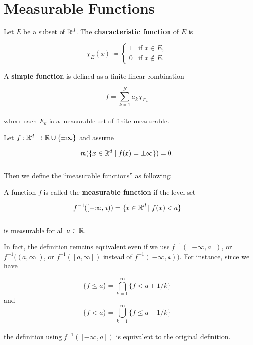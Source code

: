 \documentclass[12pt, a4paper, openany, twoside]{book}
\theoremstyle{definition}
\theoremstyle{remark}
\theoremstyle{plain}
\numberwithin{equation}{section}
\begin{document}
\section{Measurable Functions}
\vspace{5mm}
\begin{tcolorbox}[colback=yellow!10!white,colframe=blue!75!black,title=Definition 1.4.1]\label{Definition 1.4.1}
    Let $E$ be a subset of ${\mathbb {R}}^d$. The \textbf{characteristic function} of $E$ is 

    \[\chi_{E}(x)\coloneqq\begin{cases}
        1 & \text{if $x\in E$},\\
        0 & \text{if $x\notin E$}.
    \end{cases}\]
\end{tcolorbox}
\vspace{5mm}
\begin{tcolorbox}[colback=yellow!10!white,colframe=blue!75!black,title=Definition 1.4.2]\label{Definition 1.4.2}
    A \textbf{simple function} is defined as a finite linear combination 

    \[f=\sum_{k=1}^{N}{a_k\chi_{E_k}}\]
    \\
    where each $E_k$ is a measurable set of finite measurable.
\end{tcolorbox}
\vspace{5mm}

Let $f:{\mathbb {R}}^d\rightarrow {\mathbb {R}}\cup\{\pm\infty\}$ and assume

\[m(\{x\in{\mathbb {R}}^d \mid f(x)=\pm\infty\})=0.\]
\\
Then we define the ``measurable functions'' as following:

\vspace{5mm}
\begin{tcolorbox}[colback=yellow!10!white,colframe=blue!75!black,title=Definition 1.4.3]\label{Definition 1.4.3}
    A function $f$ is called the \textbf{measurable function} if the level set 

    \[f^{-1}([-\infty,a))=\{x\in {\mathbb {R}}^d \mid f(x)<a\}\]
    \\
    is measurable for all $a\in{\mathbb {R}}$.
\end{tcolorbox}
\vspace{5mm}

In fact, the definition remains equivalent even if we use $f^{-1}([-\infty,a])$, or $f^{-1}((a,\infty])$, or $f^{-1}([a,\infty])$ instead of $f^{-1}([-\infty,a))$. For instance, since we have

\[\{f\leq a\}=\bigcap_{k=1}^{\infty}{\{f<a+1/k\}}\]
and 
\[\{f<a\}=\bigcup_{k=1}^{\infty}{\{f\leq a-1/k\}}\]
\\
the definition using $f^{-1}([-\infty,a])$ is equivalent to the original definition. 
\end{document}
